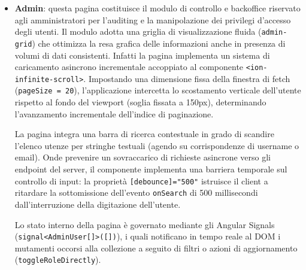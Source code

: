 \documentclass[11pt,a4paper]{article}
\begin{document}
\begin{itemize}
    \item \textbf{Admin}: questa pagina costituisce il modulo di controllo e backoffice riservato agli amministratori per l'auditing e la manipolazione dei privilegi d'accesso degli utenti. Il modulo adotta una griglia di visualizzazione fluida (\texttt{admin-grid}) che ottimizza la resa grafica delle informazioni anche in presenza di volumi di dati consistenti. Infatti la pagina implementa un sistema di caricamento asincrono incrementale accoppiato al componente \texttt{<ion-infinite-scroll>}. Impostando una dimensione fissa della finestra di fetch (\texttt{pageSize = 20}), l'applicazione intercetta lo scostamento verticale dell'utente rispetto al fondo del viewport (soglia fissata a 150px), determinando l'avanzamento incrementale dell'indice di paginazione.
    
    La pagina integra una barra di ricerca contestuale in grado di scandire l'elenco utenze per stringhe testuali (agendo su corrispondenze di username o email). Onde prevenire un sovraccarico di richieste asincrone verso gli endpoint del server, il componente implementa una barriera temporale sul controllo di input: la proprietà \texttt{[debounce]="500"} istruisce il client a ritardare la sottomissione dell'evento \texttt{onSearch} di 500 millisecondi dall'interruzione della digitazione dell'utente.
    
    Lo stato interno della pagina è governato mediante gli Angular Signals (\texttt{signal<AdminUser[]>([])}), i quali notificano in tempo reale al DOM i mutamenti occorsi alla collezione a seguito di filtri o azioni di aggiornamento (\texttt{toggleRoleDirectly}). 
    

\end{itemize}
\end{document}
